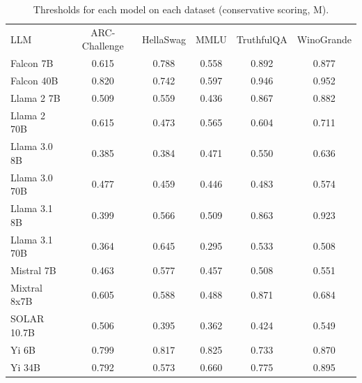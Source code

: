 \begin{table}[h]
\caption{Thresholds for each model on each dataset (conservative scoring, M). }
\label{tab:thresholds_prob_max_k20_w2}
\centering
\begin{tabular}{l S[table-format=3.1] S[table-format=3.1] S[table-format=3.1] S[table-format=3.1] S[table-format=3.1]}
\toprule
LLM & ARC-Challenge & HellaSwag & MMLU & TruthfulQA & WinoGrande \\ 
\cmidrule(lr){1-1} \cmidrule(lr){2-2} \cmidrule(lr){3-3} \cmidrule(lr){4-4} \cmidrule(lr){5-5} \cmidrule(lr){6-6}
Falcon 7B & 0.615 & 0.788 & 0.558 & 0.892 & 0.877\\
Falcon 40B & 0.820 & 0.742 & 0.597 & 0.946 & 0.952\\
Llama 2 7B & 0.509 & 0.559 & 0.436 & 0.867 & 0.882\\
Llama 2 70B & 0.615 & 0.473 & 0.565 & 0.604 & 0.711\\
Llama 3.0 8B & 0.385 & 0.384 & 0.471 & 0.550 & 0.636\\
Llama 3.0 70B & 0.477 & 0.459 & 0.446 & 0.483 & 0.574\\
Llama 3.1 8B & 0.399 & 0.566 & 0.509 & 0.863 & 0.923\\
Llama 3.1 70B & 0.364 & 0.645 & 0.295 & 0.533 & 0.508\\
Mistral 7B & 0.463 & 0.577 & 0.457 & 0.508 & 0.551\\
Mixtral 8x7B & 0.605 & 0.588 & 0.488 & 0.871 & 0.684\\
SOLAR 10.7B & 0.506 & 0.395 & 0.362 & 0.424 & 0.549\\
Yi 6B & 0.799 & 0.817 & 0.825 & 0.733 & 0.870\\
Yi 34B & 0.792 & 0.573 & 0.660 & 0.775 & 0.895\\
\bottomrule
\end{tabular}
\end{table}
